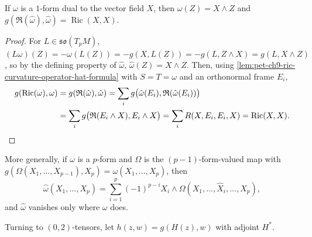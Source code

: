 \begin{proposition}[Proposition 9.4.10]
  \label{prop:pet-ch9-1form-hat-ricci}
  If $\omega$ is a $1$-form dual to the vector field $X$, then
  $\hat\omega(Z)=X\wedge Z$ and $g(\mathfrak{R}(\hat\omega),\hat\omega)=\operatorname{Ric}(X,X)$.
\end{proposition}
\begin{proof}
  For $L\in\mathfrak{so}(T_pM)$, $(L\omega)(Z)=-\omega(L(Z))=-g(X,L(Z))
  =-g(L,Z\wedge X)=g(L,X\wedge Z)$, so by the defining property of
  $\hat\omega$, $\hat\omega(Z)=X\wedge Z$. Then, using
  \cref{lem:pet-ch9-ric-curvature-operator-hat-formula} with $S=T=\omega$ and
  an orthonormal frame $E_i$,
  \begin{align*}
    g(\operatorname{Ric}(\omega),\omega)
    &=g(\mathfrak{R}(\hat\omega),\hat\omega)
    =\sum_ig\big(\hat\omega(E_i),\mathfrak{R}(\hat\omega(E_i))\big)\\
    &=\sum_ig\big(\mathfrak{R}(E_i\wedge X),E_i\wedge X\big)
    =\sum_iR(X,E_i,E_i,X)=\operatorname{Ric}(X,X).\qedhere
  \end{align*}
\end{proof}

\begin{remark}
  \label{rem:pet-ch9-pform-hat-formula}
  More generally, if $\omega$ is a $p$-form and $\Omega$ is the
  $(p-1)$-form-valued map with $g(\Omega(X_1,\dots,X_{p-1}),X_p)=
  \omega(X_1,\dots,X_p)$, then
  \[
    \hat\omega(X_1,\dots,X_p)=\sum_{i=1}^p(-1)^{p-i}X_i\wedge
    \Omega(X_1,\dots,\hat X_i,\dots,X_p),
  \]
  and $\hat\omega$ vanishes only where $\omega$ does.
\end{remark}

Turning to $(0,2)$-tensors, let $h(z,w)=g(H(z),w)$ with adjoint $H^*$.

